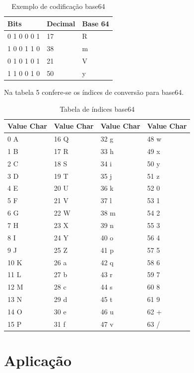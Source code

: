 \documentclass[12pt]{article}
\begin{document}
\begin{table}[ht]
	\centering
	\caption{Exemplo de codificação base64}
	\label{tab:Table4}
	\smallskip
	\begin{tabular}{ |l|l|l| }
		\hline
		Bits & Decimal & Base 64\\ \hline
		0 1 0 0 0 1 & 17 & R \\ \hline
		1 0 0 1 1 0 & 38 & m \\ \hline
		0 1 0 1 0 1 & 21 & V \\ \hline
		1 1 0 0 1 0 & 50 & y \\ \hline
	\end{tabular}
\end{table}

Na tabela 5 confere-se os índices de conversão para base64.

\begin{table}[ht]
	\centering
	\caption{Tabela de índices base64}
	\label{tab:Table5}
	\smallskip
	\begin{tabular}{ |l|l|l|l| }
		\hline
		Value Char&Value Char&Value Char&Value Char \\ \hline
		0	A&	16	Q&	32	g&	48	w \\ \hline
		1	B&	17	R&	33	h&	49	x \\ \hline
		2	C&	18	S&	34	i&	50	y \\ \hline
		3	D&	19	T&	35	j&	51	z \\ \hline
		4	E&	20	U&	36	k&	52	0 \\ \hline
		5	F&	21	V&	37	l&	53	1 \\ \hline
		6	G&	22	W&	38	m&	54	2 \\ \hline
		7	H&	23	X&	39	n&	55	3 \\ \hline
		8	I&	24	Y&	40	o&	56	4 \\ \hline
		9	J&	25	Z&	41	p&	57	5 \\ \hline
		10	K&	26	a&	42	q&	58	6 \\ \hline
		11	L&	27	b&	43	r&	59	7 \\ \hline
		12	M&	28	c&	44	s&	60	8 \\ \hline
		13	N&	29	d&	45	t&	61	9 \\ \hline
		14	O&	30	e&	46	u&	62	+ \\ \hline
		15	P&	31	f&	47	v&	63	/ \\ \hline
	\end{tabular}
\end{table}

\section{Aplicação}
\end{document}

